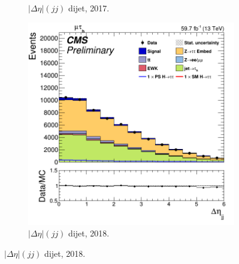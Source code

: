 \begin{figure}
\begin{subfigure}[b]{0.33\linewidth}
    \caption{$|\Delta\eta|(jj)$ dijet, 2017.} 
    \vspace{0.5ex}
  \end{subfigure} 
    \begin{subfigure}[b]{0.33\linewidth}
    \centering
    \includegraphics[width=\linewidth]{Chapitre7/Images/CtrlPlots/2018/DijetDeltaEta.png} 
    \caption{$|\Delta\eta|(jj)$ dijet, 2018.} 
    \vspace{0.5ex}
  \end{subfigure} 


\end{figure}
